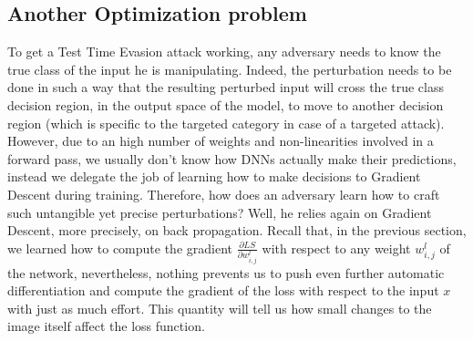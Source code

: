 \documentclass[LaM,binding=0.6cm]{./packages/sapthesis/sapthesis}
\begin{document}
    \subsection{Another Optimization problem}
        
        To get a Test Time Evasion attack working, any adversary needs to know the true class of the input he is manipulating. Indeed, the perturbation needs to be done in such a way that 
        the resulting perturbed input will cross the true class decision region, in the output space of the model, to move to another decision region (which is specific to the targeted category in case of a targeted attack).
        However, due to an high number of weights and non-linearities involved in a forward pass, we usually don't know how DNNs actually make their predictions, instead we delegate the job of learning 
        how to make decisions to Gradient Descent during training. Therefore, how does an adversary learn how to craft such untangible yet precise perturbations? Well, he relies again on Gradient Descent, more precisely,
        on back propagation. Recall that, in the previous section, we learned how to compute the gradient $\frac{\partial LS}{\partial w^{l}_{i,j}}$ with respect to any weight $ w^{l}_{i,j} $ of the 
        network, nevertheless, nothing prevents us to push even further automatic differentiation and compute the gradient of the loss with respect to the input $x$ with just as much effort. 
        This quantity will tell us how small changes to the image itself affect the loss function.
        
\end{document}
